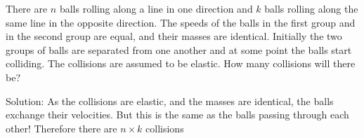 \documentclass[11]{article}
\title{\sc{Try Harder}}
\author{\sc{Rahul}}
\date{\today}
\begin{document}
\maketitle
There are $n$ balls rolling along a line in one direction and $k$ balls rolling along the same line in the opposite direction. The speeds of the balls in the first group and in the second group are equal, and their masses are identical. Initially the two groups of balls are separated from one another and at some point the balls start colliding. The collisions are assumed to be elastic. How many collisions will there be?

Solution: As the collisions are elastic, and the masses are identical, the balls exchange their velocities. But this is the same as the balls passing through each other! Therefore there are $n\times k$ collisions
\end{document}
